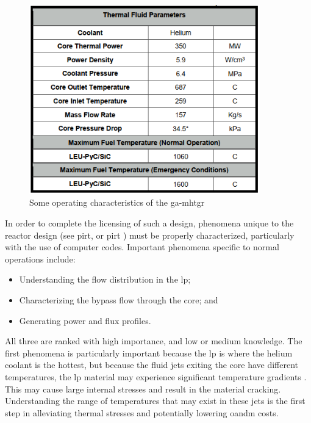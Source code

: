 \documentclass[double,12pt]{beavtex}
\begin{document}
\begin{figure}[!ht]
    \begin{center}
    	\includegraphics[width=10cm]{Figures/GA_MHTGR_Operating_Characteristics.PNG}
    	\caption{Some operating characteristics of the \acrshort{ga}-\acrshort{mhtgr}}
    	\label{fig:GA_MHTGR_Operating}
    	\end{center}
\end{figure}

In order to complete the licensing of such a design, phenomena unique to the reactor design (see \acrlong{pirt}, or \acrshort{pirt} \cite{ball_2008}) must be properly characterized, particularly with the use of computer codes. Important phenomena specific to normal operations include:
\begin{itemize}
    \item Understanding the flow distribution in the \acrshort{lp};
    \item Characterizing the bypass flow through the core; and
    \item Generating power and flux profiles.
\end{itemize}
All three are ranked with high importance, and low or medium knowledge. The first phenomena is particularly important because the \acrshort{lp} is where the helium coolant is the hottest, but because the fluid jets exiting the core have different temperatures, the \acrshort{lp} material may experience significant temperature gradients \cite{osti_1038194}. This may cause large internal stresses and result in the material cracking. Understanding the range of temperatures that may exist in these jets is the first step in alleviating thermal stresses and potentially lowering \acrshort{oandm} costs.
\end{document}
